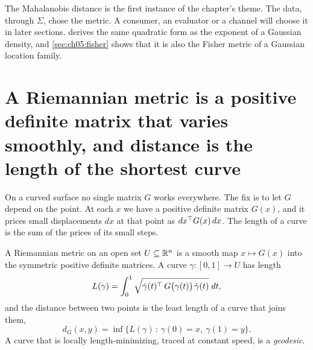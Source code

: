 The Mahalanobis distance is the first instance of the chapter's theme. The data, through $\Sigma$, chose the metric. A consumer, an evaluator or a channel will choose it in later sections.  derives the same quadratic form as the exponent of a Gaussian density, and \cref{sec:ch05:fisher} shows that it is also the Fisher metric of a Gaussian location family.



\section{A Riemannian metric is a positive definite matrix that varies smoothly, and distance is the length of the shortest curve}\label{sec:ch05:riemann}

On a curved surface no single matrix $G$ works everywhere. The fix is to let $G$ depend on the point. At each $x$ we have a positive definite matrix $G(x)$, and it prices small displacements $dx$ at that point as $dx^{\top} G(x)\,dx$. The length of a curve is the sum of the prices of its small steps.

\begin{definition}\label{def:ch05:riemann}
A Riemannian metric on an open set $U\subseteq\mathbb{R}^n$ is a smooth map $x\mapsto G(x)$ into the symmetric positive definite matrices. A curve $\gamma:[0,1]\to U$ has length
\begin{equation}\label{eq:ch05:length}
L(\gamma)=\int_0^1\sqrt{\dot\gamma(t)^{\top}\,G\big(\gamma(t)\big)\,\dot\gamma(t)}\;dt,
\end{equation}
and the distance between two points is the least length of a curve that joins them,
\begin{equation}\label{eq:ch05:geodist}
d_G(x,y)=\inf\{L(\gamma)\,:\,\gamma(0)=x,\ \gamma(1)=y\}.
\end{equation}
A curve that is locally length-minimizing, traced at constant speed, is a \emph{geodesic}.
\end{definition}

